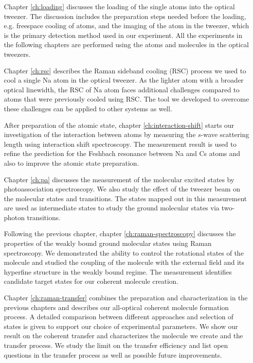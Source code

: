 Chapter \ref{ch:loading} discusses the loading of the single atoms into the optical tweezer.
The discussion includes the preparation steps needed before the loading,
e.g. freespace cooling of atoms,
and the imaging of the atom in the tweezer,
which is the primary detection method used in our experiment.
All the experiments in the following chapters are performed using
the atoms and molecules in the optical tweezers.

Chapter \ref{ch:rsc} describes the Raman sideband cooling (RSC) process
we used to cool a single Na atom in the optical tweezer.
As the lighter atom with a broader optical linewidth,
the RSC of Na atom faces additional challenges compared to atoms
that were previously cooled using RSC.
The tool we developed to overcome these challenges can be applied to other systems as well.

After preparation of the atomic state,
chapter \ref{ch:interaction-shift} starts our investigation of the interaction between atoms
by measuring the $s$-wave scattering length using interaction shift spectroscopy.
The measurement result is used to refine the prediction for the Feshbach resonance
between Na and Cs atoms and also to improve the atomic state preparation.

Chapter \ref{ch:pa} discusses the measurement of the molecular excited states
by photoassociation spectroscopy.
We also study the effect of the tweezer beam on the molecular states and transitions.
The states mapped out in this measurement are used as intermediate states
to study the ground molecular states via two-photon transitions.

Following the previous chapter, chapter \ref{ch:raman-spectroscopy} discusses
the properties of the weakly bound ground molecular states using Raman spectroscopy.
We demonstrated the ability to control the rotational states of the molecule
and studied the coupling of the molecule with the external field
and its hyperfine structure in the weakly bound regime.
The measurement identifies candidate target states for our coherent molecule creation.

Chapter \ref{ch:raman-transfer} combines the preparation and characterization
in the previous chapters and describes our all-optical coherent molecule formation process.
A detailed comparison between different approaches and selection of states is given
to support our choice of experimental parameters.
We show our result on the coherent transfer and characterizes
the molecule we create and the transfer process.
We study the limit on the transfer efficiency
and list open questions in the transfer process
as well as possible future improvements.
